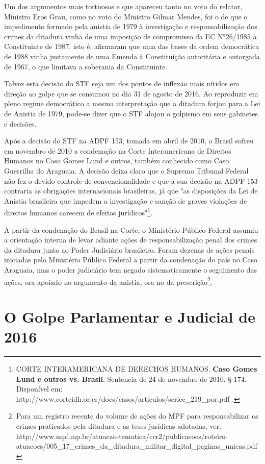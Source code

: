 Um dos argumentos mais tortuosos e que apareceu tanto no voto do
relator, Ministro Eros Grau, como no voto do Ministro Gilmar Mendes, foi
o de que o impedimento formado pela anistia de 1979 à investigação e
responsabilização dos crimes da ditadura vinha de uma imposição de
compromisso da EC N°26/1985 à Constituinte de 1987, isto é, afirmaram
que uma das bases da ordem democrática de 1988 vinha justamente de uma
Emenda à Constituição autoritária e outorgada de 1967, o que limitava a
soberania da Constituinte.

Talvez esta decisão do STF seja um dos pontos de inflexão mais nítidos
em direção ao golpe que se consumou no dia 31 de agosto de 2016. Ao
reproduzir em pleno regime democrático a mesma interpretação que a
ditadura forjou para a Lei de Anistia de 1979, pode-se dizer que o STF
alojou o golpismo em seus gabinetes e decisões.

Após a decisão do STF na ADPF 153, tomada em abril de 2010, o Brasil
sofreu em novembro de 2010 a condenação na Corte Interamericana de
Direitos Humanos no Caso Gomes Lund e outros, também conhecido como Caso
Guerrilha do Araguaia. A decisão deixa claro que o Supremo Tribunal
Federal não fez o devido controle de convencionalidade e que a sua
decisão na ADPF 153 contraria as obrigações internacionais brasileiras,
já que "as disposições da Lei de Anistia brasileira que impedem a
investigação e sanção de graves violações de direitos humanos carecem de
efeitos jurídicos"\footnote{CORTE INTERAMERICANA DE DERECHOS HUMANOS.
  \textbf{Caso Gomes Lund e outros vs. Brasil}. Sentencia de 24 de
  novembre de 2010. § 174. Disponível em:
  http://www.corteidh.or.cr/docs/casos/articulos/seriec\_219\_por.pdf .}.

A partir da condenação do Brasil na Corte, o Ministério Público Federal
assumiu a orientação interna de levar adiante ações de responsabilização
penal dos crimes da ditadura junto ao Poder Judiciário brasileiro. Foram
dezenas de ações penais iniciadas pelo Ministério Público Federal a
partir da condenação do país no Caso Araguaia, mas o poder judiciário
tem negado sistematicamente o seguimento das ações, ora apoiado no
argumento da anistia, ora no da prescrição\footnote{Para um registro
  recente do volume de ações do MPF para responsabilizar os crimes
  praticados pela ditadura e as teses jurídicas adotadas, ver:
  http://www.mpf.mp.br/atuacao-tematica/ccr2/publicacoes/roteiro-atuacoes/005\_17\_crimes\_da\_ditadura\_militar\_digital\_paginas\_unicas.pdf}.

\section{O Golpe Parlamentar e Judicial de 2016}


